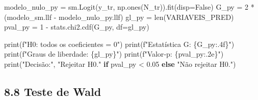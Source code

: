 \documentclass[
  letterpaper,
  DIV=11,
  numbers=noendperiod]{scrartcl}
\newenvironment{Shaded}{\begin{snugshade}}{\end{snugshade}}
\newcommand{\BuiltInTok}[1]{\textcolor[rgb]{0.00,0.23,0.31}{#1}}
\newcommand{\ControlFlowTok}[1]{\textcolor[rgb]{0.00,0.23,0.31}{\textbf{#1}}}
\newcommand{\DecValTok}[1]{\textcolor[rgb]{0.68,0.00,0.00}{#1}}
\newcommand{\FloatTok}[1]{\textcolor[rgb]{0.68,0.00,0.00}{#1}}
\newcommand{\NormalTok}[1]{\textcolor[rgb]{0.00,0.23,0.31}{#1}}
\newcommand{\OperatorTok}[1]{\textcolor[rgb]{0.37,0.37,0.37}{#1}}
\newcommand{\SpecialCharTok}[1]{\textcolor[rgb]{0.37,0.37,0.37}{#1}}
\newcommand{\SpecialStringTok}[1]{\textcolor[rgb]{0.13,0.47,0.30}{#1}}
\newcommand{\StringTok}[1]{\textcolor[rgb]{0.13,0.47,0.30}{#1}}
\newcommand{\VariableTok}[1]{\textcolor[rgb]{0.07,0.07,0.07}{#1}}
\begin{document}
\begin{Shaded}
\begin{Highlighting}[]
\NormalTok{modelo\_nulo\_py }\OperatorTok{=}\NormalTok{ sm.Logit(y\_tr, np.ones(N\_tr)).fit(disp}\OperatorTok{=}\VariableTok{False}\NormalTok{)}
\NormalTok{G\_py     }\OperatorTok{=} \DecValTok{2} \OperatorTok{*}\NormalTok{ (modelo\_sm.llf }\OperatorTok{{-}}\NormalTok{ modelo\_nulo\_py.llf)}
\NormalTok{gl\_py    }\OperatorTok{=} \BuiltInTok{len}\NormalTok{(VARIAVEIS\_PRED)}
\NormalTok{pval\_py  }\OperatorTok{=} \DecValTok{1} \OperatorTok{{-}}\NormalTok{ stats.chi2.cdf(G\_py, df}\OperatorTok{=}\NormalTok{gl\_py)}

\BuiltInTok{print}\NormalTok{(}\SpecialStringTok{f"H0: todos os coeficientes = 0"}\NormalTok{)}
\BuiltInTok{print}\NormalTok{(}\SpecialStringTok{f"Estatística G:      }\SpecialCharTok{\{}\NormalTok{G\_py}\SpecialCharTok{:.4f\}}\SpecialStringTok{"}\NormalTok{)}
\BuiltInTok{print}\NormalTok{(}\SpecialStringTok{f"Graus de liberdade: }\SpecialCharTok{\{}\NormalTok{gl\_py}\SpecialCharTok{\}}\SpecialStringTok{"}\NormalTok{)}
\BuiltInTok{print}\NormalTok{(}\SpecialStringTok{f"Valor{-}p:            }\SpecialCharTok{\{}\NormalTok{pval\_py}\SpecialCharTok{:.2e\}}\SpecialStringTok{"}\NormalTok{)}
\BuiltInTok{print}\NormalTok{(}\StringTok{"Decisão:"}\NormalTok{, }\StringTok{"Rejeitar H0."} \ControlFlowTok{if}\NormalTok{ pval\_py }\OperatorTok{\textless{}} \FloatTok{0.05} \ControlFlowTok{else} \StringTok{"Não rejeitar H0."}\NormalTok{)}
\end{Highlighting}
\end{Shaded}

\subsection{8.8 Teste de Wald}\label{teste-de-wald-1}
\end{document}

